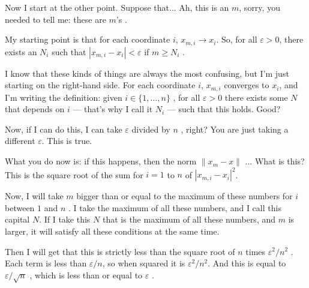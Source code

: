 \begin{proofWrapper}
\begin{speech}[01:10:16 - 01:12:27]
Now I start at the other point. Suppose that... Ah, this is an $m$, sorry, you needed to tell me: these are $m$'s .

My starting point is that for each coordinate $i$, $x_{m,i} \to x_i$. So, for all $\varepsilon > 0$, there exists an $N_i$ such that $|x_{m,i} - x_i| < \varepsilon$ if $m \ge N_i$ .

I know that these kinds of things are always the most confusing, but I'm just starting on the right-hand side. For each coordinate $i$, $x_{m,i}$ converges to $x_i$, and I'm writing the definition: given $i \in \{1, \dots, n\}$ , for all $\varepsilon > 0$ there exists some $N$ that depends on $i$ --- that's why I call it $N_i$ --- such that this holds. Good?

Now, if I can do this, I can take $\varepsilon$ divided by $n$ , right? You are just taking a different $\varepsilon$. This is true.
\end{speech}

\begin{hidden}
\end{hidden}

\begin{speech}[01:12:27 - 01:14:32]
What you do now is: if this happens, then the norm $\|x_m - x\|$ ... What is this? This is the square root of the sum for $i = 1$ to $n$ of $|x_{m,i} - x_i|^2$.

Now, I will take $m$ bigger than or equal to the maximum of these numbers for $i$ between $1$ and $n$ . I take the maximum of all these numbers, and I call this capital $N$. If I take this $N$ that is the maximum of all these numbers, and $m$ is larger, it will satisfy all these conditions at the same time.

Then I will get that this is strictly less than the square root of $n$ times $\varepsilon^2 / n^2$ . Each term is less than $\varepsilon/n$, so when squared it is $\varepsilon^2 / n^2$. And this is equal to $\varepsilon / \sqrt{n}$ , which is less than or equal to $\varepsilon$ .


\end{speech}
\end{proofWrapper}
